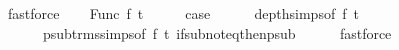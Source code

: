 \begin{isabellebody}
\ fastforce\isanewline
{}\isamarkupfalse%
\isanewline
\ \ \isamarkupfalse%
\ {\isacharparenleft}{\kern0pt}Func\ f\ t{}{\isacharprime}{\kern0pt}{\isacharparenright}{\kern0pt}\isanewline
\ \ \isamarkupfalse%
\ \isamarkupfalse%
\ {\isacharquery}{\kern0pt}case\isanewline
\ \ \ \ \isamarkupfalse%
\ depth{\isachardot}{\kern0pt}simps{\isacharparenleft}{\kern0pt}{}{\isacharparenright}{\kern0pt}{\isacharbrackleft}{\kern0pt}of\ f\ t{}{\isacharprime}{\kern0pt}{\isacharbrackright}{\kern0pt}\isanewline
\ \ \ \ \ \ psub{\isacharunderscore}{\kern0pt}trms{\isachardot}{\kern0pt}simps{\isacharparenleft}{\kern0pt}{}{\isacharparenright}{\kern0pt}{\isacharbrackleft}{\kern0pt}of\ f\ t{}{\isacharprime}{\kern0pt}{\isacharbrackright}{\kern0pt}\ if{\isacharunderscore}{\kern0pt}sub{\isacharunderscore}{\kern0pt}not{\isacharunderscore}{\kern0pt}eq{\isacharunderscore}{\kern0pt}then{\isacharunderscore}{\kern0pt}psub\isanewline
\ \ \ \ \isamarkupfalse%
\ fastforce\isanewline
{}\isamarkupfalse%
%
\endisatagproof
{\isafoldproof}%
%
\isadelimproof
\isanewline
%
\endisadelimproof
\isanewline
%
\isadelimtheory
%
\endisadelimtheory
%
\isatagtheory
%
\endisatagtheory
{\isafoldtheory}%
%
\isadelimtheory
%
\endisadelimtheory
%
\end{isabellebody}%
\endinput
